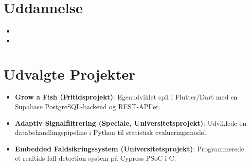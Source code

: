 \documentclass[11pt,a4paper,sans]{moderncv}
\begin{document}
\section{Uddannelse}
\vspace{1pt}
\begin{itemize}

\item{}

\vspace{3pt}

\item{}

\end{itemize}


\section{Udvalgte Projekter}
\vspace{1pt}
\begin{itemize}

\item{\textbf{Grow a Fish (Fritidsprojekt)}: Egenudviklet spil i Flutter/Dart med en Supabase PostgreSQL-backend og REST-API'er.}

\item{\textbf{Adaptiv Signalfiltrering (Speciale, Universitetsprojekt)}: Udviklede en databehandlingspipeline i Python til statistisk evalueringsmodel.}

\item{\textbf{Embedded Faldsikringssystem (Universitetsprojekt)}: Programmerede et realtids fall-detection system på Cypress PSoC i C.}

\end{itemize}

\end{document}
